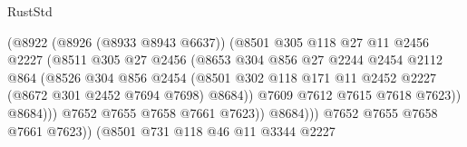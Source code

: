 \begin{lexlean}{RustStd}
\begin{coremodule}
                                    (@8922
                                      (@8926 (@8933 @8943 @6637))
                                      (@8501
                                        @305
                                        @118
                                        @27
                                        @11
                                        @2456
                                        @2227
                                        (@8511
                                          @305
                                          @27
                                          @2456
                                          (@8653
                                            @304
                                            @856
                                            @27
                                            @2244
                                            @2454
                                            @2112
                                            @864
                                            (@8526
                                              @304
                                              @856
                                              @2454
                                              (@8501
                                                @302
                                                @118
                                                @171
                                                @11
                                                @2452
                                                @2227
                                                (@8672 @301 @2452 @7694 @7698)
                                                @8684))
                                            @7609
                                            @7612
                                            @7615
                                            @7618
                                            @7623))
                                        @8684)))
                                  @7652
                                  @7655
                                  @7658
                                  @7661
                                  @7623))
                              @8684)))
                        @7652
                        @7655
                        @7658
                        @7661
                        @7623))
                    (@8501
                      @731
                      @118
                      @46
                      @11
                      @3344
                      @2227

\end{coremodule}
\end{lexlean}
